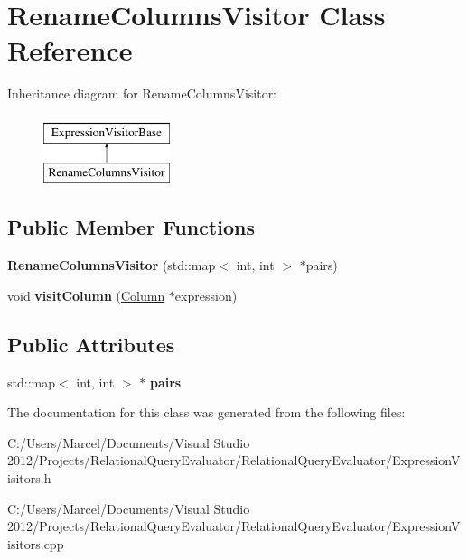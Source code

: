 \hypertarget{class_rename_columns_visitor}{\section{Rename\+Columns\+Visitor Class Reference}
\label{class_rename_columns_visitor}
}
Inheritance diagram for Rename\+Columns\+Visitor\+:\begin{figure}[H]
\begin{center}
\leavevmode
\includegraphics[height=2.000000cm]{class_rename_columns_visitor}
\end{center}
\end{figure}
\subsection*{Public Member Functions}
\begin{DoxyCompactItemize}
\item 
\hypertarget{class_rename_columns_visitor_a119cb79b414164ac4bb2adcfaf6bdcf9}{{\bfseries Rename\+Columns\+Visitor} (std\+::map$<$ int, int $>$ $\ast$pairs)}\label{class_rename_columns_visitor_a119cb79b414164ac4bb2adcfaf6bdcf9}

\item 
\hypertarget{class_rename_columns_visitor_a45835dde3fa3190a803493a0e3f1e75a}{void {\bfseries visit\+Column} (\hyperlink{class_column}{Column} $\ast$expression)}\label{class_rename_columns_visitor_a45835dde3fa3190a803493a0e3f1e75a}

\end{DoxyCompactItemize}
\subsection*{Public Attributes}
\begin{DoxyCompactItemize}
\item 
\hypertarget{class_rename_columns_visitor_a40542b4f59af34a28e298d719ca426c1}{std\+::map$<$ int, int $>$ $\ast$ {\bfseries pairs}}\label{class_rename_columns_visitor_a40542b4f59af34a28e298d719ca426c1}

\end{DoxyCompactItemize}


The documentation for this class was generated from the following files\+:\begin{DoxyCompactItemize}
\item 
C\+:/\+Users/\+Marcel/\+Documents/\+Visual Studio 2012/\+Projects/\+Relational\+Query\+Evaluator/\+Relational\+Query\+Evaluator/Expression\+Visitors.\+h\item 
C\+:/\+Users/\+Marcel/\+Documents/\+Visual Studio 2012/\+Projects/\+Relational\+Query\+Evaluator/\+Relational\+Query\+Evaluator/Expression\+Visitors.\+cpp\end{DoxyCompactItemize}
